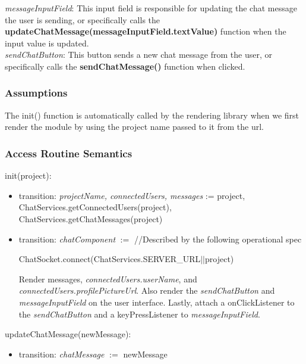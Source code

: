\documentclass[12pt, titlepage]{article}
\begin{document}
	\noindent \textit{messageInputField}: This input field is responsible for updating the chat message the user is sending, or specifically calls the \textbf{updateChatMessage(messageInputField.textValue)} function when the input value is updated.\\
	
	\noindent \textit{sendChatButton}: This button sends a new chat message from the user, or specifically calls the \textbf{sendChatMessage()} function when clicked.
	
	\subsubsection{Assumptions}
	
	The init() function is automatically called by the rendering library when we first render the module by using the project name passed to it from the url.
	
	\subsubsection{Access Routine Semantics}
	
	\noindent init(project):
	\begin{itemize}
		
		\item transition: \textit{projectName, connectedUsers, messages} := project,\\ ChatServices.getConnectedUsers(project), ChatServices.getChatMessages(project)
		
		\item transition: \textit{chatComponent} $:=$ //Described by the following operational spec
		
		\noindent ChatSocket.connect(ChatServices.SERVER\_URL$||$project)
		
		\noindent Render messages, \textit{connectedUsers.userName}, and \textit{connectedUsers.profilePictureUrl}. Also render the \textit{sendChatButton} and \textit{messageInputField} on the user interface. Lastly, attach a onClickListener to the \textit{sendChatButton} and a keyPressListener to \textit{messageInputField}.
		
	\end{itemize}
	
	\noindent updateChatMessage(newMessage):
	\begin{itemize}
		\item transition: \textit{chatMessage} $:=$ newMessage
	\end{itemize}
	
\end{document}
